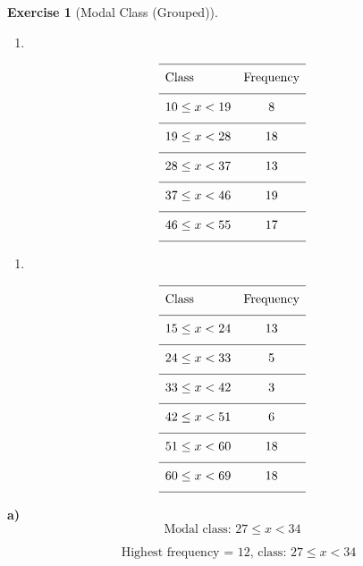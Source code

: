 \documentclass[
  letterpaper,
  DIV=11,
  numbers=noendperiod]{scrreprt}
\providecommand{\tightlist}{%
  \setlength{\itemsep}{0pt}\setlength{\parskip}{0pt}}
\theoremstyle{definition}
\newtheorem{exercise}{Exercise}[chapter]
\theoremstyle{remark}
\begin{document}
\begin{exercise}[Modal Class
(Grouped)]
\begin{enumerate}
\def\labelenumi{\alph{enumi})}
\setcounter{enumi}{2}
\tightlist
\item
\end{enumerate}

\[{\renewcommand{\arraystretch}{1.6}\begin{array}{lc}
\hline \text{Class} & \text{Frequency} \\[4pt]
\hline 10 \leq x < 19  & 8 \\[4pt]
\hline 19 \leq x < 28  & 18 \\[4pt]
\hline 28 \leq x < 37  & 13 \\[4pt]
\hline 37 \leq x < 46  & 19 \\[4pt]
\hline 46 \leq x < 55  & 17 \\[4pt]
\hline \end{array}}\]

\begin{enumerate}
\def\labelenumi{\alph{enumi})}
\setcounter{enumi}{3}
\tightlist
\item
\end{enumerate}

\[{\renewcommand{\arraystretch}{1.6}\begin{array}{lc}
\hline \text{Class} & \text{Frequency} \\[4pt]
\hline 15 \leq x < 24  & 13 \\[4pt]
\hline 24 \leq x < 33  & 5 \\[4pt]
\hline 33 \leq x < 42  & 3 \\[4pt]
\hline 42 \leq x < 51  & 6 \\[4pt]
\hline 51 \leq x < 60  & 18 \\[4pt]
\hline 60 \leq x < 69  & 18 \\[4pt]
\hline \end{array}}\]

\begin{tcolorbox}[enhanced jigsaw, opacitybacktitle=0.6, coltitle=black, arc=.35mm, colframe=quarto-callout-tip-color-frame, colback=white, bottomrule=.15mm, left=2mm, colbacktitle=quarto-callout-tip-color!10!white, titlerule=0mm, opacityback=0, title=\textcolor{quarto-callout-tip-color}{\faLightbulb}\hspace{0.5em}{🔍 View Solution}, leftrule=.75mm, breakable, rightrule=.15mm, bottomtitle=1mm, toptitle=1mm, toprule=.15mm]

\textbf{a)} \[\text{Modal class: }27 \leq x < 34\]

\[\quad \text{Highest frequency = }12\text{, class: }27 \leq x < 34\]


\end{tcolorbox}
\end{exercise}
\end{document}
